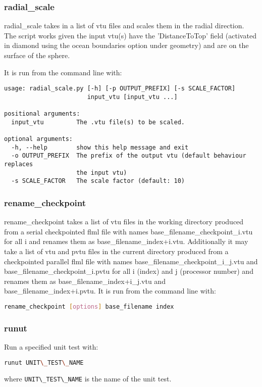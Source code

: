 
\subsubsection{radial\_scale}
\label{sec:radscal}
radial\_scale takes in a list of vtu files and scales them in the radial direction. The script works given the input vtu(s) have the 'DistanceToTop' field (activated in diamond using the ocean boundaries option under geometry) and are on the surface of the sphere.

It is run from the command line with:
\begin{lstlisting}
usage: radial_scale.py [-h] [-p OUTPUT_PREFIX] [-s SCALE_FACTOR]
                       input_vtu [input_vtu ...]

positional arguments:
  input_vtu         The .vtu file(s) to be scaled.

optional arguments:
  -h, --help        show this help message and exit
  -o OUTPUT_PREFIX  The prefix of the output vtu (default behaviour replaces
                    the input vtu)
  -s SCALE_FACTOR   The scale factor (default: 10)
\end{lstlisting}


\subsubsection{rename\_checkpoint}
\label{sec:rename_checkpoint}
rename\_checkpoint takes a list of vtu files in the working directory produced from a serial checkpointed flml file with names base\_filename\_checkpoint\_i.vtu for all i and renames them as base\_filename\_index+i.vtu. Additionally it may take a list of
vtu and pvtu files in the current directory produced from a checkpointed parallel flml file with names base\_filename\_checkpoint\_i\_j.vtu and base\_filename\_checkpoint\_i.pvtu for all i (index) and j (processor number) and renames them as base\_filename\_index+i\_j.vtu and base\_filename\_index+i.pvtu. It is run from the command line with:
\begin{lstlisting}[language = Bash]
rename_checkpoint [options] base_filename index
\end{lstlisting}


\subsubsection{runut}
\label{sec:runut}
Run a specified unit test with:
\begin{lstlisting}[language = Bash]
runut UNIT\_TEST\_NAME
\end{lstlisting} 
where \lstinline[language = Bash]+UNIT\_TEST\_NAME+ is the name of the unit test.

